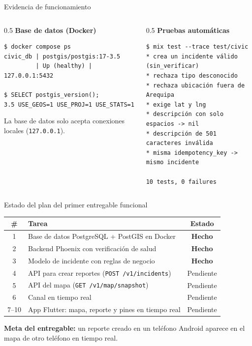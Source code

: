 \documentclass[aspectratio=169,10pt]{beamer}
\newcommand{\hecho}{\textbf{Hecho}}
\newcommand{\pendiente}{Pendiente}
\begin{document}
\begin{frame}[fragile]{Evidencia de funcionamiento}
  \begin{columns}[T]
    \begin{column}{0.5\textwidth}
      \textbf{\small Base de datos (Docker)}
\begin{lstlisting}
$ docker compose ps
civic_db | postgis/postgis:17-3.5
         | Up (healthy) | 127.0.0.1:5432

$ SELECT postgis_version();
3.5 USE_GEOS=1 USE_PROJ=1 USE_STATS=1
\end{lstlisting}
      \scriptsize La base de datos solo acepta conexiones locales (\texttt{127.0.0.1}).
    \end{column}
    \begin{column}{0.5\textwidth}
      \textbf{\small Pruebas automáticas}
\begin{lstlisting}
$ mix test --trace test/civic
* crea un incidente válido (sin_verificar)
* rechaza tipo desconocido
* rechaza ubicación fuera de Arequipa
* exige lat y lng
* descripción con solo espacios -> nil
* descripción de 501 caracteres inválida
* misma idempotency_key -> mismo incidente

10 tests, 0 failures
\end{lstlisting}
    \end{column}
  \end{columns}
\end{frame}

\begin{frame}{Estado del plan del primer entregable funcional}
  \small
  \begin{table}
    \begin{tabular}{clc}
      \toprule
      \textbf{\#} & \textbf{Tarea} & \textbf{Estado} \\
      \midrule
      1 & Base de datos PostgreSQL + PostGIS en Docker & \hecho \\
      2 & Backend Phoenix con verificación de salud & \hecho \\
      3 & Modelo de incidente con reglas de negocio & \hecho \\
      4 & API para crear reportes (\texttt{POST /v1/incidents}) & \pendiente \\
      5 & API del mapa (\texttt{GET /v1/map/snapshot}) & \pendiente \\
      6 & Canal en tiempo real & \pendiente \\
      7--10 & App Flutter: mapa, reporte y pines en tiempo real & \pendiente \\
      \bottomrule
    \end{tabular}
  \end{table}
  \vfill
  \textbf{Meta del entregable:} un reporte creado en un teléfono Android aparece en el mapa de otro teléfono en tiempo real.
\end{frame}

\end{document}
